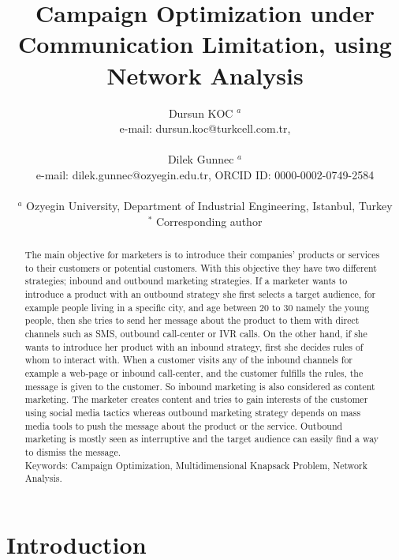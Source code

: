 \documentclass[11pt]{article}
\title{Campaign Optimization under Communication Limitation, using Network Analysis \\}
\author{Dursun KOC $^{a}$ \\ 
	e-mail: dursun.koc@turkcell.com.tr, \\\\
	Dilek Gunnec $^{a}$ \\ 
	e-mail: dilek.gunnec@ozyegin.edu.tr, ORCID ID: 0000-0002-0749-2584 \\\\
$^{a}$ Ozyegin University, Department of Industrial Engineering, Istanbul, Turkey \\ 
$^{\ast}$ Corresponding author \\ }
\date{}
\begin{document}
\maketitle
\begin{abstract}
The main objective for marketers is to introduce their companies’ products or services to their customers or potential customers. With this objective they have two different strategies; inbound and outbound marketing strategies. If a marketer wants to introduce a product with an outbound strategy she first selects a target audience, for example people living in a specific city, and age between 20 to 30 namely the young people, then she tries to send her message about the product to them with direct channels such as SMS, outbound call-center or IVR calls. On the other hand, if she wants to introduce her product with an inbound strategy, first she decides rules of whom to interact with. When a customer visits any of the inbound channels for example a web-page or inbound call-center, and the customer fulfills the rules, the message is given to the customer. So inbound marketing is also considered as content marketing. The marketer creates content and tries to gain interests of the customer using social media tactics whereas outbound marketing strategy depends on mass media tools to push the message about the product or the service. Outbound marketing is mostly seen as interruptive and the target audience can easily find a way to dismiss the message. \\

Keywords: Campaign Optimization, Multidimensional Knapsack Problem, Network Analysis.

\end{abstract}


\newpage

\section{Introduction}
\end{document}
